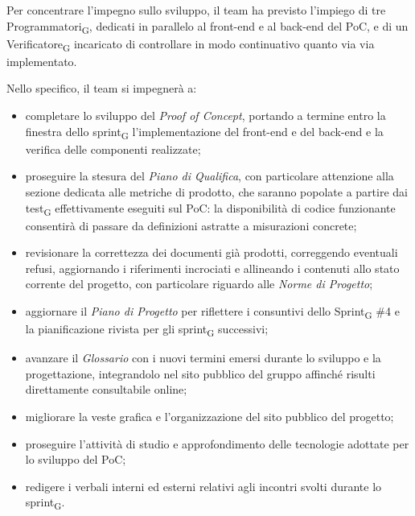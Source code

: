 ﻿\documentclass[a4paper, 10pt, colorlinks=true, linkcolor=black, urlcolor=blue, citecolor=blue, hidelinks]{article}
\begin{document}
Per concentrare l'impegno sullo sviluppo, il team ha previsto l'impiego di tre Programmatori\textsubscript{G}, dedicati in parallelo al front-end e al back-end del PoC, e di un Verificatore\textsubscript{G} incaricato di controllare in modo continuativo quanto via via implementato.

Nello specifico, il team si impegnerà a:
\begin{itemize}
    \item completare lo sviluppo del \textit{Proof of Concept}, portando a termine entro la finestra dello sprint\textsubscript{G} l'implementazione del front-end e del back-end e la verifica delle componenti realizzate;

    \item proseguire la stesura del \textit{Piano di Qualifica}, con particolare attenzione alla sezione dedicata alle metriche di prodotto, che saranno popolate a partire dai test\textsubscript{G} effettivamente eseguiti sul PoC: la disponibilità di codice funzionante consentirà di passare da definizioni astratte a misurazioni concrete;

    \item revisionare la correttezza dei documenti già prodotti, correggendo eventuali refusi, aggiornando i riferimenti incrociati e allineando i contenuti allo stato corrente del progetto, con particolare riguardo alle \textit{Norme di Progetto};

    \item aggiornare il \textit{Piano di Progetto} per riflettere i consuntivi dello Sprint\textsubscript{G} \#4 e la pianificazione rivista per gli sprint\textsubscript{G} successivi;

    \item avanzare il \textit{Glossario} con i nuovi termini emersi durante lo sviluppo e la progettazione, integrandolo nel sito pubblico del gruppo affinché risulti direttamente consultabile online;

    \item migliorare la veste grafica e l'organizzazione del sito pubblico del progetto;

    \item proseguire l'attività di studio e approfondimento delle tecnologie adottate per lo sviluppo del PoC;

    \item redigere i verbali interni ed esterni relativi agli incontri svolti durante lo sprint\textsubscript{G}.
\end{itemize}
\end{document}
